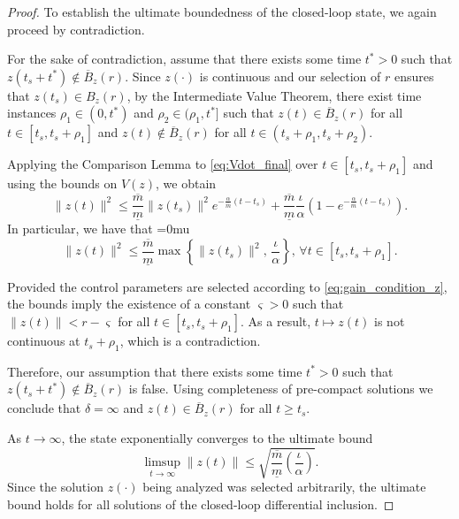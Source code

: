 \documentclass[conference]{ieeeconf}
\begin{document}
\begin{proof}
To establish the ultimate boundedness of the closed-loop state, we again proceed by contradiction.

For the sake of contradiction, assume that there exists some time $t^* > 0$ such that $z(t_{s}+t^*) \notin \overline{B}_z(r)$. Since $z(\cdot)$ is continuous and our selection of $r$ ensures that $z(t_s)\in B_z(r)$, by the Intermediate Value Theorem, there exist time instances $\rho_1 \in (0, t^*)$ and $\rho_2 \in (\rho_1, t^*]$ such that $z(t) \in \overline{B}_z(r)$ for all $t \in [t_{s}, t_{s}+\rho_1]$ and $z(t) \notin \overline{B}_z(r)$ for all $t \in (t_{s}+\rho_1, t_{s}+\rho_2)$.

Applying the Comparison Lemma to \eqref{eq:Vdot_final} over $t \in [t_{s}, t_{s}+\rho_1]$ and using the bounds on $V(z)$, we obtain
\begin{equation}
\|z(t)\|^2 \le \frac{\overline{m}}{\underline{m}}\|z(t_{s})\|^2 e^{-\frac{\alpha}{\overline{m}}(t-t_{s})} + \frac{\overline{m}}{\underline{m}} \frac{\iota}{\alpha} \left( 1 - e^{-\frac{\alpha}{\overline{m}}(t-t_{s})} \right).
\end{equation}
In particular, we have that
\begingroup\medmuskip=0mu\begin{equation}\label{eq:max_bound_z}
\|z(t)\|^2 \le \frac{\overline{m}}{\underline{m}} \max\left\{ \|z(t_{s})\|^2, \, \frac{\iota}{\alpha} \right\}, \, \forall t \in [t_{s}, t_{s}+\rho_1].
\end{equation}\endgroup

Provided the control parameters are selected according to \eqref{eq:gain_condition_z}, the bounds imply the existence of a constant $\varsigma > 0$ such that $\|z(t)\| < r - \varsigma$ for all $t \in [t_{s}, t_{s}+\rho_1]$. As a result, $t \mapsto z(t)$ is not continuous at $t_{s}+\rho_1$, which is a contradiction. 

Therefore, our assumption that there exists some time $t^* > 0$ such that $z(t_{s}+t^*) \notin \overline{B}_z(r)$ is false. Using completeness of pre-compact solutions\cite[Prop.~2]{SCC.Ryan1990} we conclude that $\delta = \infty$ and $z(t) \in \overline{B}_z(r)$ for all $t \ge t_{s}$. 

As $t \to \infty$, the state exponentially converges to the ultimate bound
\begin{equation}
\limsup_{t \to \infty} \|z(t)\| \le \sqrt{ \frac{\overline{m}}{\underline{m}} \left(\frac{\iota}{\alpha}\right) }.
\end{equation}
Since the solution $z(\cdot)$ being analyzed was selected arbitrarily, the ultimate bound holds for all solutions of the closed-loop differential inclusion.

\end{proof}
\end{document}
